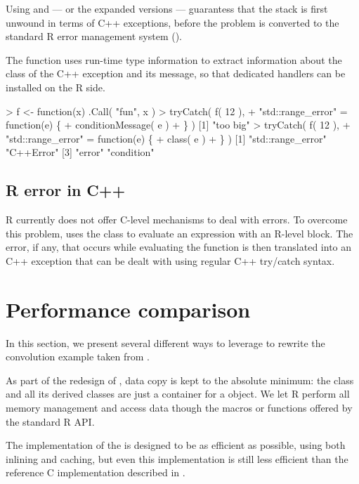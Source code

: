 Using  and  --- or the expanded versions ---
guarantess that the stack is first unwound in terms of C++ exceptions, before 
the problem is converted to the standard R error management system ().

The  function uses run-time type information to 
extract information about the class of the C++ exception and its message, so that 
dedicated handlers can be installed on the R side. 

\begin{example}
> f <- function(x) .Call( "fun", x )
> tryCatch( f( 12 ), 
+    "std::range_error" = function(e) \{
+       conditionMessage( e )
+    \} )
[1] "too big"
> tryCatch( f( 12 ), 
+    "std::range_error" = function(e) \{
+       class( e )
+    \} )
[1] "std::range_error" "C++Error"
[3] "error"            "condition" 
\end{example}

\subsection{R error in C++}

R currently does not offer C-level mechanisms to deal with errors. To 
overcome this problem,  uses the 
class to evaluate an expression with an R-level 
block. The error, if any, that occurs while evaluating the 
function is then translated into an C++ exception that can be dealt with using 
regular C++ try/catch syntax.

\section{Performance comparison}

In this section, we present several different ways to leverage  to 
rewrite the convolution example taken from \cite{R:exts}. 

As part of the redesign of , data copy is kept to the
absolute minimum: the  class and all its derived
classes are just a container for a  object. We let R perform
all memory management and access data though the macros or functions
offered by the standard R API. 

The implementation of the  is designed to be as 
efficient as possible, using both inlining and caching, 
but even this implementation is still less efficient than the 
reference C implementation described in \cite{R:exts}. 

